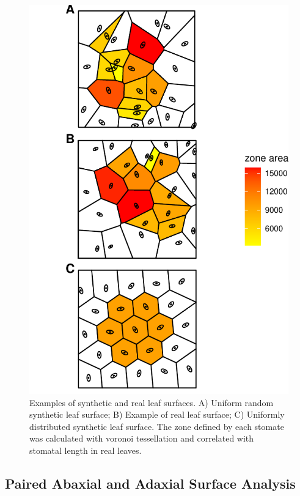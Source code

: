 \documentclass[webpdf,large,modern,unnumsec,namedate]{oup-authoring-template}
\begin{document}
\begin{figure}[ht]
\includegraphics[height = \textheight]{figures/tessellation-example.pdf}
\caption{Examples of synthetic and real leaf surfaces.  A) Uniform random synthetic leaf surface; B) Example of real leaf surface; C) Uniformly distributed synthetic leaf surface. The zone defined by each stomate was calculated with voronoi tessellation and correlated with stomatal length in real leaves.}
\label{fig:tessellation-example}
\end{figure}

\subsection{Paired Abaxial and Adaxial Surface
Analysis}\label{paired-abaxial-and-adaxial-surface-analysis}
\end{document}
